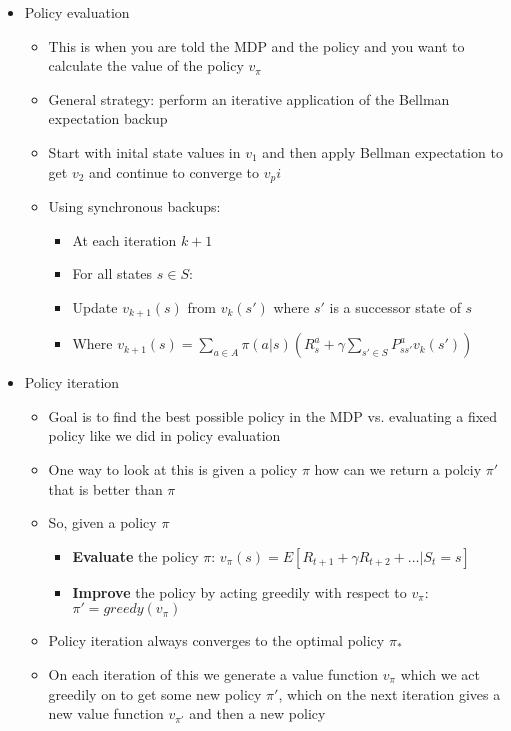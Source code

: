 \documentclass[12pt]{article}
\begin{document}
\begin{itemize}
\begin{itemize}
    \end{itemize}
    \item Policy evaluation
    \begin{itemize}
      \item This is when you are told the MDP and the policy and you want to calculate the
      value of the policy $v_\pi$
      \item General strategy: perform an iterative application of the Bellman expectation backup
      \item Start with inital state values in $v_1$ and then apply Bellman expectation to get $v_2$
      and continue to converge to $v_pi$
      \item Using synchronous backups:
      \begin{itemize}
        \item At each iteration $k+1$
        \item For all states $s \in S$:
        \item Update $v_{k+1}(s)$ from $v_k(s')$ where $s'$ is a successor state of $s$
        \item Where $v_{k+1}(s) = \sum_{a \in A}\pi(a | s) (R_{s}^a + \gamma \sum_{s' \in S}P_{ss'}^a v_{k}(s'))$
      \end{itemize}
    \end{itemize}
    \item Policy iteration
    \begin{itemize}
      \item Goal is to find the best possible policy in the MDP vs. evaluating a fixed policy like
      we did in policy evaluation
      \item One way to look at this is given a policy $\pi$ how can we return a polciy $\pi'$ that is
      better than $\pi$
      \item So, given a policy $\pi$
      \begin{itemize}
        \item \textbf{Evaluate} the policy $\pi$: $v_\pi(s) = E[R_{t+1} + \gamma R_{t+2} + \dots | S_t = s]$
        \item \textbf{Improve} the policy by acting greedily with respect to $v_\pi$: $\pi' = greedy(v_\pi)$
      \end{itemize}
      \item Policy iteration always converges to the optimal policy $\pi_*$
      \item On each iteration of this we generate a value function $v_\pi$ which we act greedily on to get some
      new policy $\pi'$, which on the next iteration gives a new value function $v_{\pi'}$ and then a new policy

\end{itemize}
\end{itemize}
\end{document}
